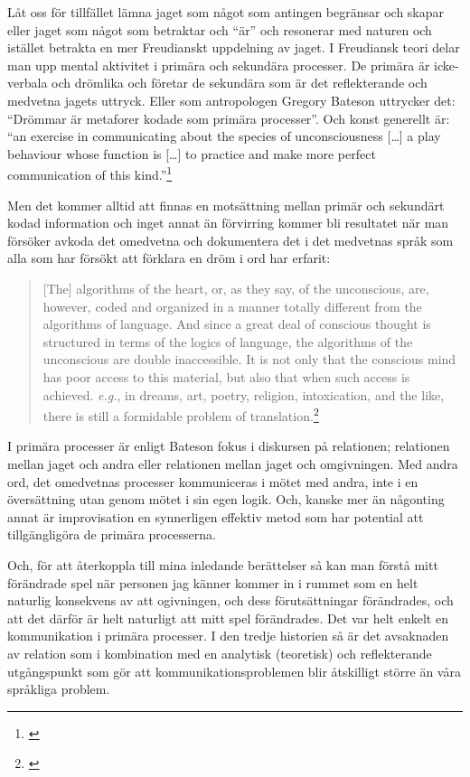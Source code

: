 \documentclass[a4paper]{article}
\begin{document}
Låt oss för tillfället lämna jaget som något som antingen begränsar och skapar eller jaget som något som betraktar och ``är'' och resonerar med naturen och istället betrakta en mer Freudianskt uppdelning av jaget. I Freudiansk teori delar man upp mental aktivitet i primära och sekundära processer. De primära är icke-verbala och drömlika och företar de sekundära som är det reflekterande och medvetna jagets uttryck. Eller som antropologen Gregory Bateson uttrycker det: ``Drömmar är metaforer kodade som primära processer''. Och konst generellt är: ``an exercise in communicating about the species of
unconsciousness [\ldots] a play behaviour whose function is [\ldots]
to practice and make more perfect communication of this
kind.''\footnote{\citet[p. 137]{bateson72}}

Men det kommer alltid att finnas en motsättning mellan primär och sekundärt kodad information och inget annat än förvirring kommer bli resultatet när man försöker avkoda det omedvetna och dokumentera det i det medvetnas språk som alla som har försökt att förklara en dröm i ord har erfarit:

\begin{quote}
  [The] algorithms of the heart, or, as they say, of the unconscious,
  are, however, coded and organized in a manner totally different from
  the algorithms of language. And since a great deal of conscious
  thought is structured in terms of the logics of language, the
  algorithms of the unconscious are double inaccessible. It is not
  only that the conscious mind has poor access to this material, but
  also that when such access is achieved. \emph{e.g.}, in dreams,
  art, poetry, religion, intoxication, and the like, there is still a
  formidable problem of translation.\footnote{\citet[p. 139]{bateson72}}
\end{quote}

I primära processer är enligt Bateson fokus i diskursen på relationen; relationen mellan jaget och andra eller relationen mellan jaget och omgivningen. Med andra ord, det omedvetnas processer kommuniceras i mötet med andra, inte i en översättning utan genom mötet i sin egen logik. Och, kanske mer än någonting annat är improvisation en synnerligen effektiv metod som har potential att tillgängligöra de primära processerna. 

Och, för att återkoppla till mina inledande berättelser så kan man förstå mitt förändrade spel när personen jag känner kommer in i rummet som en helt naturlig konsekvens av att ogivningen, och dess förutsättningar förändrades, och att det därför är helt naturligt att mitt spel förändrades. Det var helt enkelt en kommunikation i primära processer. I den tredje historien så är det avsaknaden av relation som i kombination med en analytisk (teoretisk) och reflekterande utgångspunkt som gör att kommunikationsproblemen blir åtskilligt större än våra språkliga problem.
\end{document}
